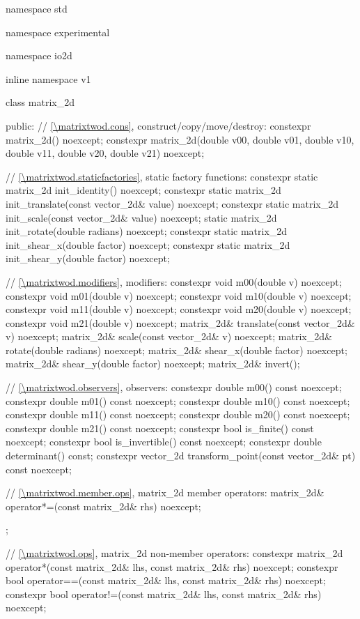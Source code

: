 \begin{codeblock}
namespace std { namespace experimental { namespace io2d { inline namespace v1 {
  class matrix_2d {
  public:
    // \ref{\matrixtwod.cons}, construct/copy/move/destroy:
    constexpr matrix_2d() noexcept;
    constexpr matrix_2d(double v00, double v01, double v10, double v11,
      double v20, double v21) noexcept;
    
    // \ref{\matrixtwod.staticfactories}, static factory functions:
    constexpr static matrix_2d init_identity() noexcept;
    constexpr static matrix_2d init_translate(const vector_2d& value) noexcept;
    constexpr static matrix_2d init_scale(const vector_2d& value) noexcept;
    static matrix_2d init_rotate(double radians) noexcept;
    constexpr static matrix_2d init_shear_x(double factor) noexcept;
    constexpr static matrix_2d init_shear_y(double factor) noexcept;
    
    // \ref{\matrixtwod.modifiers}, modifiers:
    constexpr void m00(double v) noexcept;
    constexpr void m01(double v) noexcept;
    constexpr void m10(double v) noexcept;
    constexpr void m11(double v) noexcept;
    constexpr void m20(double v) noexcept;
    constexpr void m21(double v) noexcept;
    matrix_2d& translate(const vector_2d& v) noexcept;
    matrix_2d& scale(const vector_2d& v) noexcept;
    matrix_2d& rotate(double radians) noexcept;
    matrix_2d& shear_x(double factor) noexcept;
    matrix_2d& shear_y(double factor) noexcept;
    matrix_2d& invert();
    
    // \ref{\matrixtwod.observers}, observers:
    constexpr double m00() const noexcept;
    constexpr double m01() const noexcept;
    constexpr double m10() const noexcept;
    constexpr double m11() const noexcept;
    constexpr double m20() const noexcept;
    constexpr double m21() const noexcept;
    constexpr bool is_finite() const noexcept;
    constexpr bool is_invertible() const noexcept;
    constexpr double determinant() const;
    constexpr vector_2d transform_point(const vector_2d& pt) const noexcept;
    
    // \ref{\matrixtwod.member.ops}, matrix_2d member operators:
    matrix_2d& operator*=(const matrix_2d& rhs) noexcept;
  };
    
  // \ref{\matrixtwod.ops}, matrix_2d non-member operators:
  constexpr matrix_2d operator*(const matrix_2d& lhs, const matrix_2d& rhs)
    noexcept;
  constexpr bool operator==(const matrix_2d& lhs, const matrix_2d& rhs)
    noexcept;
  constexpr bool operator!=(const matrix_2d& lhs, const matrix_2d& rhs)
    noexcept;
} } } }
\end{codeblock}

